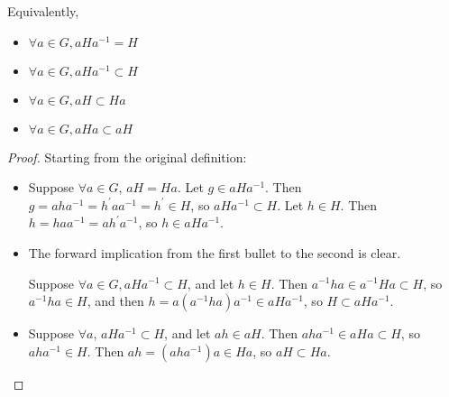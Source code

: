 Equivalently,
\begin{itemize}
  \item{$\forall a \in G, a H a^{-1} = H$}
  \item{$\forall a \in G, a H a^{-1} \subset H$}
  \item{$\forall a \in G, a H \subset Ha$}
  \item{$\forall a \in G, a H a \subset a H$}
\end{itemize}
\begin{proof}

Starting from the original definition:
\begin{itemize}
  \item{
    Suppose $\forall a \in G$, $a H = H a$. Let $g \in a H a^{-1}$. Then
    $g = a h a^{-1} = h^\prime a a^{-1} = h^\prime \in H$, so $a H a^{-1} \subset H$.
    Let $h \in H$. Then $h = h a a^{-1} = a h^\prime a^{-1}$, so $h \in a H a^{-1}$.
  }
  \item{
    The forward implication from the first bullet to the second is clear.

    Suppose $\forall a \in G, a H a^{-1} \subset H$, and let $h \in H$. Then
    $a^{-1} h a \in a^{-1} H a \subset H$, so $a^{-1} h a \in H$, and then
    $h = a (a^{-1} h a) a^{-1} \in a H a^{-1}$, so $H \subset a H a^{-1}$.
  }
  \item{
    Suppose $\forall a$, $a H a^{-1} \subset H$, and let $ah \in aH$. Then
    $a h a^{-1} \in a H a \subset H$, so $a h a^{-1} \in H$. Then
    $ah = (aha^{-1})a \in Ha$, so $aH \subset Ha$.
  }
%
\end{itemize}
\end{proof}
%

